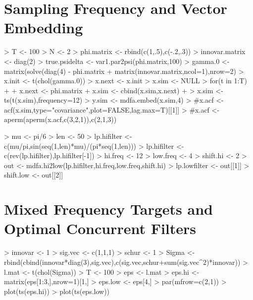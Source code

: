 \documentclass[a4paper]{book}
\begin{document}
\section{Sampling Frequency and Vector Embedding}
\label{sec:mix-svf}

\begin{Schunk}
\begin{Sinput}
> T <- 100
> N <- 2
> phi.matrix <- rbind(c(1,.5),c(-.2,.3))
> innovar.matrix <- diag(2)
> true.psidelta <- var1.par2psi(phi.matrix,100)
> gamma.0 <- matrix(solve(diag(4) - phi.matrix %
+ 	matrix(innovar.matrix,ncol=1),nrow=2)
> x.init <- t(chol(gamma.0)) %
> x.next <- x.init
> x.sim <- NULL
> for(t in 1:T)
+ {
+ 	x.next <- phi.matrix %
+ 	x.sim <- cbind(x.sim,x.next)
+ }
> x.sim <- ts(t(x.sim),frequency=12)
> y.sim <- mdfa.embed(x.sim,4)
> #x.acf <- acf(x.sim,type="covariance",plot=FALSE,lag.max=T)[[1]]
> #x.acf <- aperm(aperm(x.acf,c(3,2,1)),c(2,1,3))
\end{Sinput}
\end{Schunk}



\begin{Schunk}
\begin{Sinput}
>  mu <- pi/6
>  len <- 50
>  lp.hifilter <- c(mu/pi,sin(seq(1,len)*mu)/(pi*seq(1,len)))
>  lp.hifilter <- c(rev(lp.hifilter),lp.hifilter[-1])
>  hi.freq <- 12
>  low.freq <- 4
>  shift.hi <- 2
>  out <- mdfa.hi2low(lp.hifilter,hi.freq,low.freq,shift.hi)
>  lp.lowfilter <- out[[1]]  
>  shift.low <- out[[2]]
\end{Sinput}
\end{Schunk}

\section{Mixed Frequency Targets and Optimal Concurrent Filters}
\label{sec:mix-mdfa}

\begin{Schunk}
\begin{Sinput}
>  innovar <- 1
>  sig.vec <- c(1,1,1)
>  schur <- 1 
>  Sigma <- rbind(cbind(innovar*diag(3),sig.vec),c(sig.vec,schur+sum(sig.vec^2)*innovar))
>  l.mat <- t(chol(Sigma))
>  T <- 100
>  eps <- l.mat %
>  eps.hi <- matrix(eps[1:3,],nrow=1)[1,]
>  eps.low <- eps[4,]
>  par(mfrow=c(2,1))
>  plot(ts(eps.hi))
>  plot(ts(eps.low))
\end{Sinput}
\end{Schunk}
\end{document}
